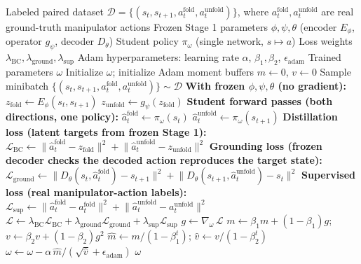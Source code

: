 \documentclass[11pt]{article}
\begin{document}
\begin{algorithm}[H]
\caption{Policy Distillation from Bidirectional Latent Actions}
\label{alg:blam-distill}
\begin{algorithmic}[1]
\Require Labeled paired dataset $\mathcal{D} = \{(s_t, s_{t+1}, a_t^{\text{fold}}, a_t^{\text{unfold}})\}$, where $a_t^{\text{fold}}, a_t^{\text{unfold}}$ are real ground-truth manipulator actions
\Require Frozen Stage 1 parameters $\phi, \psi, \theta$ (encoder $E_\phi$, operator $g_\psi$, decoder $D_\theta$)
\Require Student policy $\pi_\omega$ (single network, $s \mapsto a$)
\Require Loss weights $\lambda_{\text{BC}}, \lambda_{\text{ground}}, \lambda_{\text{sup}}$
\Require Adam hyperparameters: learning rate $\alpha$, $\beta_1, \beta_2$, $\epsilon_{\text{adam}}$
\Ensure Trained parameters $\omega$
\State Initialize $\omega$; initialize Adam moment buffers $m \gets 0$, $v \gets 0$
    \State Sample minibatch $\{(s_t, s_{t+1}, a_t^{\text{fold}}, a_t^{\text{unfold}})\} \sim \mathcal{D}$
    \State \textbf{With frozen $\phi, \psi, \theta$ (no gradient):}
    \State \hspace{1em} $z_{\text{fold}} \gets E_\phi(s_t, s_{t+1})$
    \State \hspace{1em} $z_{\text{unfold}} \gets g_\psi(z_{\text{fold}})$
    \State \textbf{Student forward passes (both directions, one policy):}
    \State \hspace{1em} $\hat{a}_t^{\text{fold}} \gets \pi_\omega(s_t)$
    \State \hspace{1em} $\hat{a}_t^{\text{unfold}} \gets \pi_\omega(s_{t+1})$
    \State \textbf{Distillation loss (latent targets from frozen Stage 1):}
    \State \hspace{1em} $\mathcal{L}_{\text{BC}} \gets \lVert \hat{a}_t^{\text{fold}} - z_{\text{fold}} \rVert^2 + \lVert \hat{a}_t^{\text{unfold}} - z_{\text{unfold}} \rVert^2$
    \State \textbf{Grounding loss (frozen decoder checks the decoded action reproduces the target state):}
    \State \hspace{1em} $\mathcal{L}_{\text{ground}} \gets \lVert D_\theta(s_t, \hat{a}_t^{\text{fold}}) - s_{t+1} \rVert^2 + \lVert D_\theta(s_{t+1}, \hat{a}_t^{\text{unfold}}) - s_t \rVert^2$
    \State \textbf{Supervised loss (real manipulator-action labels):}
    \State \hspace{1em} $\mathcal{L}_{\text{sup}} \gets \lVert \hat{a}_t^{\text{fold}} - a_t^{\text{fold}} \rVert^2 + \lVert \hat{a}_t^{\text{unfold}} - a_t^{\text{unfold}} \rVert^2$
    \State $\mathcal{L} \gets \lambda_{\text{BC}}\mathcal{L}_{\text{BC}} + \lambda_{\text{ground}}\mathcal{L}_{\text{ground}} + \lambda_{\text{sup}}\mathcal{L}_{\text{sup}}$
    \State $g \gets \nabla_{\omega}\,\mathcal{L}$
    \State $m \gets \beta_1 m + (1-\beta_1) g$; \quad $v \gets \beta_2 v + (1-\beta_2) g^2$
    \State $\hat{m} \gets m / (1-\beta_1^{t})$; \quad $\hat{v} \gets v / (1-\beta_2^{t})$
    \State $\omega \gets \omega - \alpha\, \hat{m} / (\sqrt{\hat{v}} + \epsilon_{\text{adam}})$
\EndWhile
\State \Return $\omega$ 
\end{algorithmic}
\end{algorithm}
\end{document}
